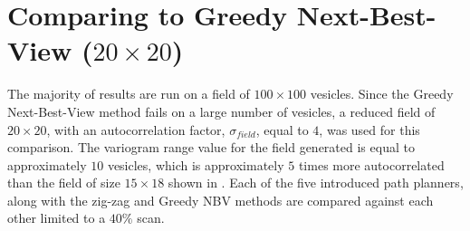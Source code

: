 \section{Comparing to Greedy Next-Best-View ($20 \times 20$)} \label{sec:s2_nbvcomp}
The majority of results are run on a field of $100 \times 100$ vesicles. Since the Greedy Next-Best-View method fails on a large number of vesicles, a reduced field of $20 \times 20$, with an autocorrelation factor, $\sigma_{field}$, equal to $4$, was used for this comparison. The variogram range value for the field generated is equal to approximately $10$ vesicles, which is approximately $5$ times more autocorrelated than the field of size $15 \times 18$ shown in \cite{fentanes:soilkrig}. Each of the five introduced path planners, along with the zig-zag and Greedy NBV methods are compared against each other limited to a $40\%$ scan. \\\\

